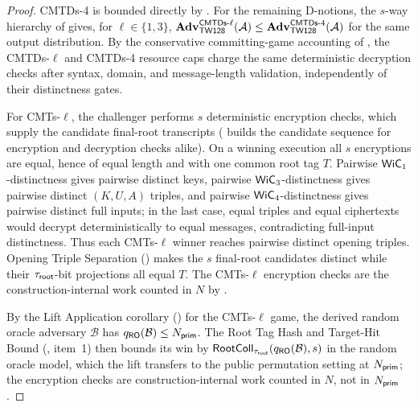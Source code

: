 \begin{proof}
CMTDs-4 is bounded directly by . For the remaining
D-notions, the $s$-way hierarchy of \cite[\S3, Fig.~5 and
App.~A]{BH22} gives, for $\ell \in \{1,3\}$,
$\mathbf{Adv}^{\mathsf{CMTDs}\text{-}\ell}_{\textsf{TW128}}(\mathcal{A}) \leq
\mathbf{Adv}^{\mathsf{CMTDs}\text{-}4}_{\textsf{TW128}}(\mathcal{A})$ for the same output distribution. By the
conservative committing-game accounting of , the
CMTDs-$\ell$ and CMTDs-4 resource caps charge the same deterministic
decryption checks after syntax, domain, and message-length validation,
independently of their distinctness gates.

For CMTs-$\ell$, the challenger performs $s$ deterministic encryption
checks, which supply the candidate final-root transcripts
( builds the candidate sequence for
encryption and decryption checks alike). On a winning execution all
$s$ encryptions are equal, hence of equal length and with one common root
tag $T$. Pairwise $\mathsf{WiC}_1$-distinctness gives pairwise distinct keys,
pairwise $\mathsf{WiC}_3$-distinctness gives pairwise distinct $(K, U, A)$ triples,
and pairwise $\mathsf{WiC}_4$-distinctness gives pairwise distinct full inputs; in
the last case, equal triples and equal ciphertexts would decrypt
deterministically to equal messages, contradicting full-input
distinctness. Thus each CMTs-$\ell$ winner reaches pairwise distinct
opening triples. Opening Triple Separation () makes
the $s$ final-root candidates distinct while their $\tau_{\mathsf{root}}$-bit
projections all equal $T$.
The CMTs-$\ell$ encryption checks are the construction-internal work
counted in $N$ by .

By the Lift Application corollary () for the
CMTs-$\ell$ game, the derived random oracle adversary $\mathcal{B}$ has
$q_{\mathsf{RO}}(\mathcal{B}) \leq N_{\mathsf{prim}}$. The Root Tag Hash and Target-Hit Bound
(, item~1) then bounds its win by
$\mathsf{RootColl}_{\tau_{\mathsf{root}}}(q_{\mathsf{RO}}(\mathcal{B}), s)$ in the random oracle model,
which the lift transfers to the public permutation setting at $N_{\mathsf{prim}}$;
the encryption checks are construction-internal work counted in $N$, not
in $N_{\mathsf{prim}}$.
\end{proof}
